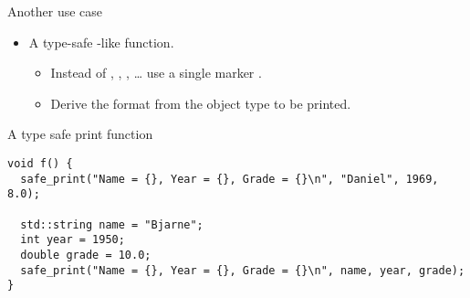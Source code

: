 \begin{frame}[t,fragile]{Another use case}
\begin{itemize}
  \item A type-safe -like function.
    \begin{itemize}
      \item Instead of , , , \ldots
            use a single marker \cppstr{\{\}}.
      \item Derive the format from the object type to be printed.
    \end{itemize}
\end{itemize}


\begin{block}{A type safe print function}
\begin{lstlisting}
void f() {
  safe_print("Name = {}, Year = {}, Grade = {}\n", "Daniel", 1969, 8.0);

  std::string name = "Bjarne";
  int year = 1950;
  double grade = 10.0;
  safe_print("Name = {}, Year = {}, Grade = {}\n", name, year, grade);
}
\end{lstlisting}
\end{block}
\end{frame}
